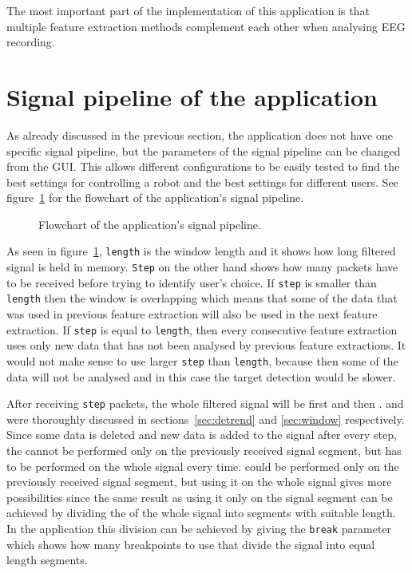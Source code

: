 The most important part of the implementation of this application is that multiple \gls{feature extraction} methods complement each other when analysing \gls{EEG} recording.

\section{Signal pipeline of the application}
\label{sec:signal_pipeline}

As already discussed in the previous section, the application does not have one specific signal pipeline, but the parameters of the signal pipeline can be changed from the \gls{GUI}. This allows different configurations to be easily tested to find the best settings for controlling a robot and the best settings for different users. See figure~\ref{fig:signal_pipeline} for the flowchart of the application's signal pipeline.

\begin{figure}[h!]
	
	\caption{Flowchart of the application's signal pipeline.}
	\label{fig:signal_pipeline}
\end{figure}

As seen in figure~\ref{fig:signal_pipeline}, \texttt{length} is the \gls{window} length and it shows how long filtered signal is held in memory. \texttt{Step} on the other hand shows how many packets have to be received before trying to identify user's choice. If \texttt{step} is smaller than \texttt{length} then the \gls{window} is overlapping which means that some of the data that was used in previous \gls{feature extraction} will also be used in the next \gls{feature extraction}. If \texttt{step} is equal to \texttt{length}, then every consecutive \gls{feature extraction} uses only new data that has not been analysed by previous \glspl{feature extraction}. It would not make sense to use larger \texttt{step} than \texttt{length}, because then some of the data will not be analysed and in this case the \gls{target} detection would be slower.

After receiving \texttt{step} packets, the whole filtered signal will be first  and then .  and  were thoroughly discussed in sections~\ref{sec:detrend} and \ref{sec:window} respectively. Since some data is deleted and new data is added to the signal after every step, the  cannot be performed only on the previously received signal segment, but has to be performed on the whole signal every time.  could be performed only on the previously received signal segment, but using it on the whole signal gives more possibilities since the same result as using it only on the signal segment can be achieved by dividing the  of the whole signal into segments with suitable length. In the application this division can be achieved by giving the \texttt{break} parameter which shows how many breakpoints to use that divide the signal into equal length segments.

